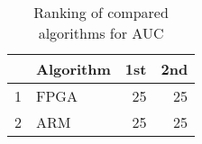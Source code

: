 \begin{table}
\footnotesize
\caption{Ranking of compared algorithms for AUC}
\label{tab:places AUC}
\begin{tabular}{llrr}
\hline
 & Algorithm & 1st & 2nd \\
\hline
1 & FPGA & 25 & 25 \\
2 & ARM & 25 & 25 \\
\hline
\end{tabular}
\end{table}
